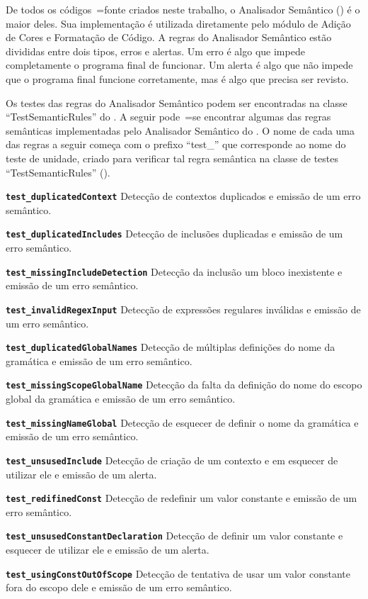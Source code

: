 De todos os códigos~=fonte criados neste trabalho,
o Analisador Semântico () é o maior deles.
Sua implementação é utilizada diretamente pelo módulo de Adição de Cores e
Formatação de Código.
A regras do Analisador Semântico estão divididas entre dois tipos,
erros e
alertas.
Um erro é algo que impede completamente o programa final de funcionar.
Um alerta é algo que não impede que o programa final funcione corretamente,
mas é algo que precisa ser revisto.

Os testes das regras do Analisador Semântico podem ser encontradas na classe ``TestSemanticRules'' do .
A seguir pode~=se encontrar algumas das regras semânticas implementadas pelo Analisador Semântico do .
O nome de cada uma das regras a seguir começa com o prefixo ``test\_'' que corresponde ao nome do teste de unidade,
criado para verificar tal regra semântica na classe de testes ``TestSemanticRules'' ().
\begin{enumerateoptional}[.]
\item[\bfseries\texttt{test_duplicatedContext}] Detecção de contextos duplicados e
emissão de um erro semântico.
\item[\bfseries\texttt{test_duplicatedIncludes}] Detecção de inclusões duplicadas  e
emissão de um erro semântico.
\item[\bfseries\texttt{test_missingIncludeDetection}] Detecção da inclusão um bloco inexistente e
emissão de um erro semântico.
\item[\bfseries\texttt{test_invalidRegexInput}] Detecção de expressões regulares inválidas e
emissão de um erro semântico.
\item[\bfseries\texttt{test_duplicatedGlobalNames}] Detecção de múltiplas definições do nome da gramática e
emissão de um erro semântico.
\item[\bfseries\texttt{test_missingScopeGlobalName}] Detecção da falta da definição do nome do escopo global da gramática e
emissão de um erro semântico.
\item[\bfseries\texttt{test_missingNameGlobal}] Detecção de esquecer de definir o nome da gramática e
emissão de um erro semântico.
\item[\bfseries\texttt{test_unsusedInclude}] Detecção de criação de um contexto e
em esquecer de utilizar ele e
emissão de um alerta.
\item[\bfseries\texttt{test_redifinedConst}] Detecção de redefinir um valor constante e
emissão de um erro semântico.
\item[\bfseries\texttt{test_unsusedConstantDeclaration}] Detecção de definir um valor constante e esquecer de utilizar ele e
emissão de um alerta.
\item[\bfseries\texttt{test_usingConstOutOfScope}] Detecção de tentativa de usar um valor constante fora do escopo dele e
emissão de um erro semântico.
\end{enumerateoptional}%
